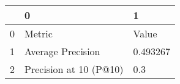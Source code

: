 \begin{tabular}{lll}
\toprule
{} &                       0 &         1 \\
\midrule
0 &                  Metric &     Value \\
1 &       Average Precision &  0.493267 \\
2 &  Precision at 10 (P@10) &       0.3 \\
\bottomrule
\end{tabular}
